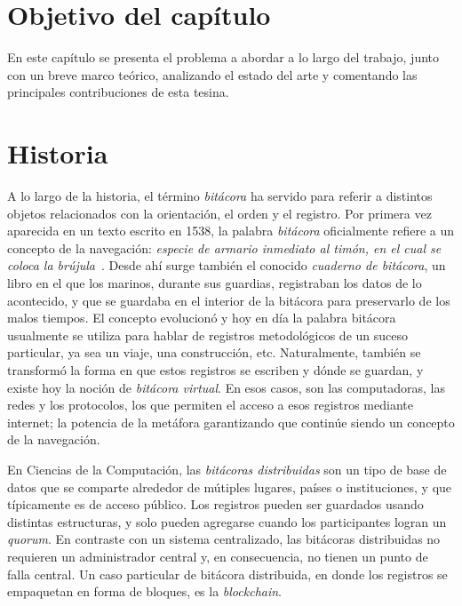 \section{Objetivo del capítulo}
En este capítulo se presenta el problema a abordar a lo largo del trabajo, junto con un breve
marco teórico, analizando el estado del arte y comentando las principales contribuciones de esta
tesina.

\section{Historia}


A lo largo de la historia, el término \textit{bitácora} ha servido para referir a
distintos objetos relacionados con la orientación, el orden y el registro. Por
primera vez aparecida en un texto escrito en 1538,
la palabra \textit{bitácora}
oficialmente refiere a un concepto de la navegación: \textit{especie de armario
inmediato al timón, en el cual se coloca la brújula}~\cite{dic.Etimologico}.
Desde ahí surge también
el conocido \textit{cuaderno de bitácora}, un libro en el que los marinos, durante
sus guardias, registraban los datos de lo acontecido, y que se guardaba en el
interior de la bitácora para preservarlo de los malos tiempos. El concepto
evolucionó y hoy en día la palabra bitácora usualmente se utiliza para hablar
de registros metodológicos de un suceso particular, ya sea un viaje, una
construcción, etc. Naturalmente, también se transformó la forma en que estos
registros se escriben y dónde se guardan, y existe hoy la noción de \textit{bitácora
virtual}. En esos casos, son las computadoras, las redes y los protocolos,
los que permiten el acceso a esos registros mediante internet; la potencia de la
metáfora garantizando que continúe siendo un concepto de la navegación.
%

En Ciencias de la Computación, las \textit{bitácoras distribuidas} son un tipo de
base de datos que se comparte
alrededor de mútiples lugares, países o instituciones, y que típicamente es de
acceso público. Los registros pueden ser guardados usando distintas estructuras,
y solo pueden agregarse cuando los participantes logran un \textit{quorum}. En
contraste con un sistema centralizado, las bitácoras distribuidas no requieren
un administrador central y, en consecuencia, no tienen un punto de falla central.
Un caso particular de bitácora distribuida, en donde los registros se empaquetan
en forma de bloques, es la \textit{blockchain}.

